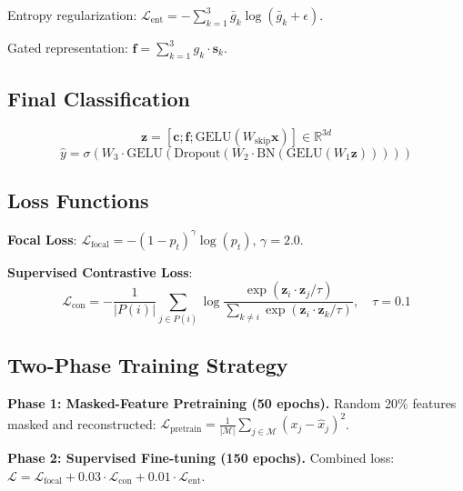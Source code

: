 \documentclass[12pt,a4paper]{article}
\begin{document}
Entropy regularization: $\mathcal{L}_{\text{ent}} = -\sum_{k=1}^{3} \bar{g}_k \log(\bar{g}_k + \epsilon)$.

Gated representation: $\mathbf{f} = \sum_{k=1}^{3} g_k \cdot \mathbf{s}_k$.

\subsection{Final Classification}
\begin{equation}
\mathbf{z} = [\mathbf{c}; \mathbf{f}; \text{GELU}(W_{\text{skip}} \mathbf{x})] \in \mathbb{R}^{3d}
\end{equation}
\begin{equation}
\hat{y} = \sigma(W_3 \cdot \text{GELU}(\text{Dropout}(W_2 \cdot \text{BN}(\text{GELU}(W_1 \mathbf{z})))))
\end{equation}

\subsection{Loss Functions}

\textbf{Focal Loss}\cite{lin2017focal}: $\mathcal{L}_{\text{focal}} = -(1 - p_t)^\gamma \log(p_t)$, $\gamma = 2.0$.

\textbf{Supervised Contrastive Loss}\cite{khosla2020}:
\begin{equation}
\mathcal{L}_{\text{con}} = -\frac{1}{|P(i)|} \sum_{j \in P(i)} \log \frac{\exp(\mathbf{z}_i \cdot \mathbf{z}_j / \tau)}{\sum_{k \neq i} \exp(\mathbf{z}_i \cdot \mathbf{z}_k / \tau)}, \quad \tau = 0.1
\end{equation}

\subsection{Two-Phase Training Strategy}

\textbf{Phase 1: Masked-Feature Pretraining (50 epochs).} Random 20\% features masked and reconstructed: $\mathcal{L}_{\text{pretrain}} = \frac{1}{|\mathcal{M}|} \sum_{j \in \mathcal{M}} (x_j - \hat{x}_j)^2$.

\textbf{Phase 2: Supervised Fine-tuning (150 epochs).} Combined loss: $\mathcal{L} = \mathcal{L}_{\text{focal}} + 0.03 \cdot \mathcal{L}_{\text{con}} + 0.01 \cdot \mathcal{L}_{\text{ent}}$.
\end{document}
